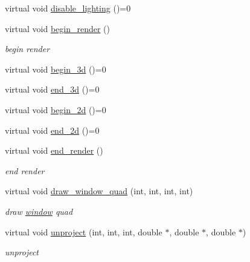 \begin{DoxyCompactItemize}
virtual void \hyperlink{classnebula_1_1platform_1_1renderer_1_1base_a31113fc53b2a1c65645f7534a8f6bfcc}{disable\_\-lighting} ()=0
\item 
virtual void \hyperlink{classnebula_1_1platform_1_1renderer_1_1base_a125a4fd0dfc31be859c37067eaada43d}{begin\_\-render} ()
\begin{DoxyCompactList}\small\item\em begin render \item\end{DoxyCompactList}\item 
virtual void \hyperlink{classnebula_1_1platform_1_1renderer_1_1base_a2028e1c00c65bec5ded87373048d939d}{begin\_\-3d} ()=0
\item 
virtual void \hyperlink{classnebula_1_1platform_1_1renderer_1_1base_a0029bf3d8dca641962a7f54cbc0d8a35}{end\_\-3d} ()=0
\item 
virtual void \hyperlink{classnebula_1_1platform_1_1renderer_1_1base_a80e8a44929910992d3c3d831978be14e}{begin\_\-2d} ()=0
\item 
virtual void \hyperlink{classnebula_1_1platform_1_1renderer_1_1base_a5e365d3edf9b4196d101e265a52a7157}{end\_\-2d} ()=0
\item 
virtual void \hyperlink{classnebula_1_1platform_1_1renderer_1_1base_aa3caace8ed843895f841504742150d7a}{end\_\-render} ()
\begin{DoxyCompactList}\small\item\em end render \item\end{DoxyCompactList}\item 
virtual void \hyperlink{classnebula_1_1platform_1_1renderer_1_1base_a53de4e109fe24d7254aa1b5864cbe283}{draw\_\-window\_\-quad} (int, int, int, int)
\begin{DoxyCompactList}\small\item\em draw \hyperlink{namespacenebula_1_1platform_1_1window}{window} quad \item\end{DoxyCompactList}\item 
virtual void \hyperlink{classnebula_1_1platform_1_1renderer_1_1base_a29759f9e2d0ac477b16ad27dc8aa4f0f}{unproject} (int, int, int, double $\ast$, double $\ast$, double $\ast$)
\begin{DoxyCompactList}\small\item\em unproject \item\end{DoxyCompactList}\end{DoxyCompactItemize}
